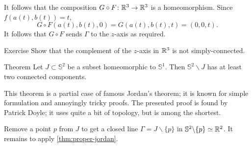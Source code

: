 It follows that the composition $G\circ F\colon\mathbb{R}^3\to\mathbb{R}^3$ is a homeomorphism.
Since $f(a(t),b(t))=t$,
\[G\circ F(a(t),b(t),0)=G(a(t),b(t),t)=(0,0,t).\]
It follows that $G\circ F$ sends $\Gamma$ to the $z$-axis as required.
\qeds

\begin{thm}{Exercise}\label{ex:z-axis}
Show that the complement of the $z$-axis in $\mathbb{R}^3$ is not simply-connected.
\end{thm}

\begin{thm}{Theorem}
Let $J\subset\mathbb{S}^2$ be a subset homeomorphic to $\mathbb{S}^1$.
Then $\mathbb{S}^2\backslash J$ has at least two connected components. 
\end{thm}

This theorem is a partial case of famous Jordan's theorem;
it is known for simple formulation and annoyingly tricky proofs.
The presented proof is found by Patrick Doyle; 
it uses quite a bit of topology, but is among the shortest.

Remove a point $p$ from $J$ to get a closed line $\Gamma=J\backslash\{p\}$ in $ \mathbb{S}^2\backslash\{p\}\simeq\mathbb{R}^2$.
It remains to apply \ref{thm:proper-jordan}.
\qeds
